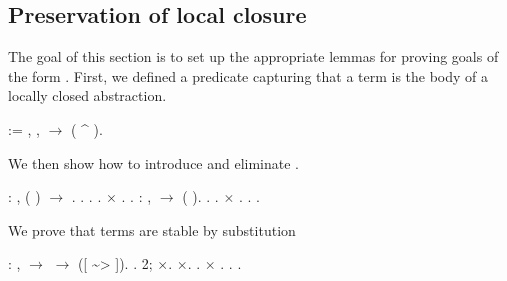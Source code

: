 \documentclass[12pt]{report}
\begin{document}
\subsection{Preservation of local closure}



 The goal of this section is to set up the appropriate lemmas 
    for proving goals of the form  . First, we defined a
    predicate capturing that a term  is the body of a locally
    closed abstraction. 
\begin{coqdoccode}
\coqdocemptyline
\coqdocnoindent
{}   :=\coqdoceol
\coqdocindent{1.00em}
\coqdoctac{\ensuremath{\exists}} , \coqdockw{\ensuremath{\forall}} ,    \ensuremath{\rightarrow}  ( \^{} ).\coqdoceol
\coqdocemptyline
\end{coqdoccode}
We then show how to introduce and eliminate  . 
\begin{coqdoccode}
\coqdocemptyline
\coqdocnoindent
{}  : \coqdockw{\ensuremath{\forall}} , \coqdoceol
\coqdocindent{1.00em}
 ( ) \ensuremath{\rightarrow}  .\coqdoceol
\coqdocnoindent
{}. .  . \ensuremath{\times} . .\coqdoceol
\coqdocemptyline
\coqdocnoindent
{}  : \coqdockw{\ensuremath{\forall}} , \coqdoceol
\coqdocindent{1.00em}
  \ensuremath{\rightarrow}  ( ).\coqdoceol
\coqdocnoindent
{}. . \ensuremath{\times} . .\coqdoceol
\coqdocemptyline
\coqdocnoindent
{}  .\coqdoceol
\coqdocemptyline
\end{coqdoccode}
We prove that terms are stable by substitution 
\begin{coqdoccode}
\coqdocemptyline
\coqdocnoindent
{}  : \coqdockw{\ensuremath{\forall}}   ,\coqdoceol
\coqdocindent{1.00em}
  \ensuremath{\rightarrow}   \ensuremath{\rightarrow}  ([ \~{}> ]).\coqdoceol
\coqdocnoindent
{}.\coqdoceol
\coqdocindent{1.00em}
 2; \ensuremath{\times}.\coqdoceol
\coqdocindent{1.00em}
\ensuremath{\times}.\coqdoceol
\coqdocindent{1.00em}
 . \ensuremath{\times} .\coqdoceol
\coqdocnoindent
{}.\coqdoceol
\coqdocemptyline
\coqdocnoindent
{} .\coqdoceol
\coqdocemptyline
\end{coqdoccode}
\end{document}
